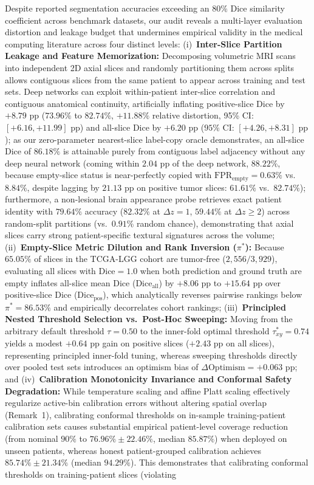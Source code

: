 \documentclass[11pt,a4paper]{article}
\begin{document}
Despite reported segmentation accuracies exceeding an $80\%$ Dice similarity coefficient across benchmark datasets, our audit reveals a multi-layer evaluation distortion and leakage budget that undermines empirical validity in the medical computing literature across four distinct levels: (i)~\textbf{Inter-Slice Partition Leakage and Feature Memorization:} Decomposing volumetric MRI scans into independent 2D axial slices and randomly partitioning them across splits allows contiguous slices from the same patient to appear across training and test sets. Deep networks can exploit within-patient inter-slice correlation and contiguous anatomical continuity, artificially inflating positive-slice Dice by $+8.79\text{ pp}$ ($73.96\%$ to $82.74\%$, $+11.88\%$ relative distortion, 95\% CI: $[+6.16, +11.99]\text{ pp}$) and all-slice Dice by $+6.20\text{ pp}$ ($95\%$ CI: $[+4.26, +8.31]\text{ pp}$); as our zero-parameter nearest-slice label-copy oracle demonstrates, an all-slice Dice of $86.18\%$ is attainable purely from contiguous label adjacency without any deep neural network (coming within $2.04\text{ pp}$ of the deep network, $88.22\%$, because empty-slice status is near-perfectly copied with $\text{FPR}_{\text{empty}} = 0.63\%$ vs.\ $8.84\%$, despite lagging by $21.13\text{ pp}$ on positive tumor slices: $61.61\%$ vs.\ $82.74\%$); furthermore, a non-lesional brain appearance probe retrieves exact patient identity with $79.64\%$ accuracy ($82.32\%$ at $\Delta z = 1$, $59.44\%$ at $\Delta z \ge 2$) across random-split partitions (vs.\ $0.91\%$ random chance), demonstrating that axial slices carry strong patient-specific textural signatures across the volume; (ii)~\textbf{Empty-Slice Metric Dilution and Rank Inversion ($\pi^*$):} Because $65.05\%$ of slices in the TCGA-LGG cohort are tumor-free ($2,556 / 3,929$), evaluating all slices with $\text{Dice} = 1.0$ when both prediction and ground truth are empty inflates all-slice mean Dice ($\text{Dice}_{\text{all}}$) by $+8.06\text{ pp}$ to $+15.64\text{ pp}$ over positive-slice Dice ($\text{Dice}_{\text{pos}}$), which analytically reverses pairwise rankings below $\pi^* = 86.53\%$ and empirically decorrelates cohort rankings; (iii)~\textbf{Principled Nested Threshold Selection vs.\ Post-Hoc Sweeping:} Moving from the arbitrary default threshold $\tau=0.50$ to the inner-fold optimal threshold $\tau_{xy}^* = 0.74$ yields a modest $+0.64\text{ pp}$ gain on positive slices ($+2.43\text{ pp}$ on all slices), representing principled inner-fold tuning, whereas sweeping thresholds directly over pooled test sets introduces an optimism bias of $\Delta\text{Optimism} = +0.063\text{ pp}$; and (iv)~\textbf{Calibration Monotonicity Invariance and Conformal Safety Degradation:} While temperature scaling and affine Platt scaling effectively regularize active-bin calibration errors without altering spatial overlap (Remark~1), calibrating conformal thresholds on in-sample training-patient calibration sets causes substantial empirical patient-level coverage reduction (from nominal $90\%$ to $76.96\% \pm 22.46\%$, median $85.87\%$) when deployed on unseen patients, whereas honest patient-grouped calibration achieves $85.74\% \pm 21.34\%$ (median $94.29\%$). This demonstrates that calibrating conformal thresholds on training-patient slices (violating 
\end{document}
